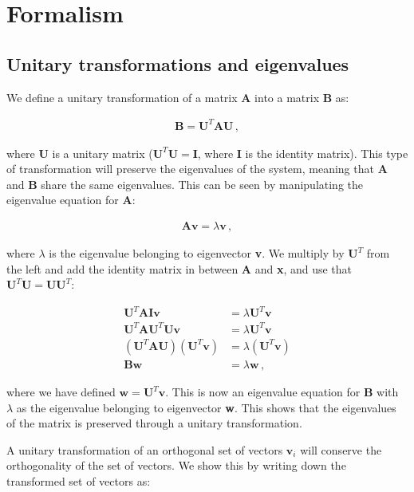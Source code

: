 \documentclass[reprint,english,notitlepage]{revtex4-1}  %
\begin{document}
\section{Formalism} \label{sec:II}

\subsection{Unitary transformations and eigenvalues} \label{sec:II:a}

We define a unitary transformation of a matrix \textbf{A} into a matrix \textbf{B} as:

\begin{align*}
\textbf{B} = \textbf{U}^T \textbf{AU} \, ,
\end{align*}

where \textbf{U} is a unitary matrix ($\textbf{U}^T\textbf{U} = \textbf{I}$, where \textbf{I} is the identity matrix). This type of transformation will preserve the eigenvalues of the system, meaning that \textbf{A} and \textbf{B} share the same eigenvalues. This can be seen by manipulating the eigenvalue equation for \textbf{A}:

\begin{align*}
\textbf{A}\textbf{v} = \lambda \textbf{v} \, , 
\end{align*} 

where $\lambda$ is the eigenvalue belonging to eigenvector \textbf{v}. We multiply by $\textbf{U}^T$ from the left and add the identity matrix in between \textbf{A} and \textbf{x}, and use that $\textbf{U}^T \textbf{U} = \textbf{UU}^T$:

\begin{align*}
\textbf{U}^T \textbf{AIv} &= \lambda \textbf{U}^T \textbf{v} \\
\textbf{U}^T \textbf{AU}^T \textbf{Uv} &= \lambda \textbf{U}^T \textbf{v} \\
(\textbf{U}^T \textbf{AU} ) (\textbf{U}^T \textbf{v}) &= \lambda (\textbf{U}^T \textbf{v}) \\
\textbf{Bw} &= \lambda \textbf{w} \, ,
\end{align*}

where we have defined $\textbf{w} = \textbf{U}^T \textbf{v}$. This is now an eigenvalue equation for \textbf{B} with $\lambda$ as the eigenvalue belonging to eigenvector \textbf{w}. This shows that the eigenvalues of the matrix is preserved through a unitary transformation.

A unitary transformation of an orthogonal set of vectors $\textbf{v}_i$ will conserve the orthogonality of the set of vectors. We show this by writing down the transformed set of vectors as:
\end{document}
